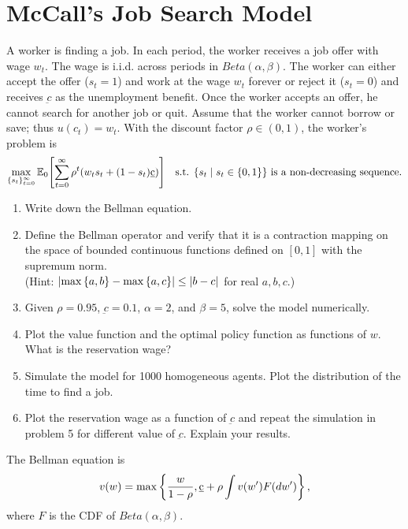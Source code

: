 \documentclass[12pt]{article}
\begin{document}
\section{McCall's Job Search Model}
A worker is finding a job. In each period, the worker receives 
a job offer with wage $w_t$. The wage is i.i.d. across periods 
in $Beta(\alpha,\beta)$. The worker can either 
accept the offer ($s_t=1$) and work at the wage $w_t$ forever 
or reject it ($s_t=0$) and receives $\underbar{c}$ as the 
unemployment benefit. Once the worker accepts an offer, he 
cannot search for another job or quit. Assume that the worker 
cannot borrow or save; thus $u(c_t)=w_t$. 
With the discount factor $\rho\in(0,1)$, the worker's problem 
is 
\begin{equation*}
    \max_{\{s_t\}_{t=0}^\infty} \E_0\sbrc{\sum_{t=0}^\infty \rho^t(w_ts_t+(1-s_t)\underbar{c})}\quad \text{s.t. $\Set{s_t}{s_t\in\set{0,1}}$ is a non-decreasing sequence}.
\end{equation*}
\begin{enumerate}
    \item Write down the Bellman equation.
    \item Define the Bellman operator and verify that it is a 
    contraction mapping on the space of bounded continuous functions 
    defined on $[0,1]$ with the supremum norm.\\
    (Hint: $\left\lvert {\max\left\{ {a,b} \right\}-\max\left\{ {a,c} \right\}} \right\rvert\leq\left\lvert {b-c} \right\rvert$ for real $a,b,c$.)
    \item Given $\rho = 0.95$, $\underbar{c} = 0.1$, $\alpha = 2$, 
    and $\beta = 5$, solve the model numerically.
    \item Plot the value function and the optimal policy function as functions 
    of $w$. What is the reservation wage? 
    \item Simulate the model for 1000 homogeneous agents. Plot the distribution 
    of the time to find a job. 
    \item Plot the reservation wage as a function of $\underbar{c}$ and repeat 
    the simulation in problem 5 for different value of $\underbar{c}$. Explain 
    your results.
\end{enumerate}

\begin{sol}[4.1]
    The Bellman equation is 
    \begin{equation*}
        v(w) = \max \left\{ {\frac{w}{1-\rho}, \underbar{c} + \rho \int v(w') F(dw')} \right\},
    \end{equation*}
    where $F$ is the CDF of $Beta(\alpha,\beta)$.
    \solend
\end{sol}
\end{document}
